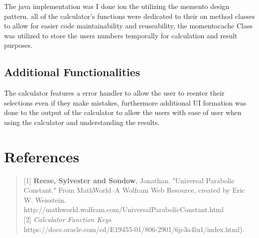 \documentclass[12pt]{report}
\begin{document}
The java implementation was I done ion the utilizing the memento design pattern. all of the calculator's functions were dedicated to their on method classes to allow for easier code maintainability and reuseability, the momentocache Class was utilized to store the users numbers temporally for calculation and result purposes.  


\section{Additional Functionalities}

The calculator features a error handler to allow the user to reenter their selections even if they make mistakes, furthermore additional UI formation was done to the output of the calculator to allow the users with ease of user when using the calculator and understanding the results. 


\chapter{References}
\begin{quote}
    

[1] \textbf{Reese, Sylvester and Sondow}, Jonathan. "Universal Parabolic Constant." From MathWorld--A Wolfram Web Resource, created by Eric W. Weisstein.\\ http://mathworld.wolfram.com/UniversalParabolicConstant.html\\

[2] {\it Calculator Function Keys\/}\\
https://docs.oracle.com/cd/E19455-01/806-2901/6jc3a4lu1/index.html).




\end{quote}
\end{document}
